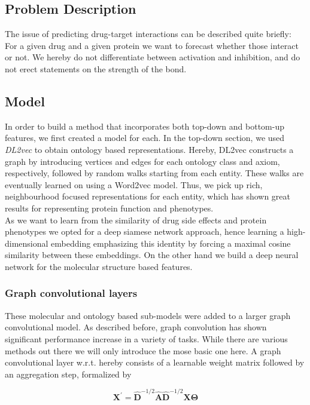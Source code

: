 \documentclass{bioinfo}
\begin{document}
\subsection{Problem Description}
The issue of predicting drug-target interactions can be described quite briefly: For a given drug and a given protein we want to forecast whether those interact or not. We hereby do not differentiate between activation and inhibition, and do not erect statements on the strength of the bond.\\

\subsection{Model} 
In order to build a method that incorporates both top-down and bottom-up features, we first created a model for each. In the top-down section, we used \textit{DL2vec}\citep{DL2vec2020} to obtain ontology based representations. Hereby, DL2vec constructs a graph by introducing vertices and edges for each ontology class and axiom, respectively, followed by random walks starting from each entity. These walks are eventually learned on using a Word2vec \citep{Word2vec2013} model. Thus, we pick up rich, neighbourhood focused representations for each entity, which has shown great results for representing protein function and phenotypes. \\

As we want to learn from the similarity of drug side effects and protein phenotypes we opted for a deep siamese network approach, hence learning a high-dimensional embedding emphasizing this identity by forcing a maximal cosine similarity between these embeddings. On the other hand we build a deep neural network for the molecular structure based features. \\

\subsubsection{Graph convolutional layers}
These molecular and ontology based sub-models were added to a larger graph convolutional model.
As described before, graph convolution has shown significant performance increase in a variety of tasks. While there are various methods out there we will only introduce the mose basic one here. A graph convolutional layer w.r.t. \citet{GCNConv} hereby consists of a learnable weight matrix followed by an aggregation step, formalized by

\begin{equation}
	\mathbf{X}^{\prime} = \mathbf{\hat{D}}^{-1/2} \mathbf{\hat{A}}
	\mathbf{\hat{D}}^{-1/2} \mathbf{X} \mathbf{\Theta}
\end{equation}
\end{document}
